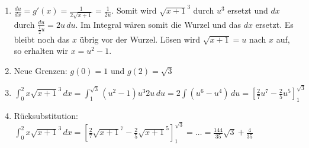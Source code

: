 \begin{enumerate}
	\item $\frac{du}{dx} = g'(x) = \frac{1}{2\sqrt{x+1}} = \frac{1}{2u}$. Somit
	wird $\sqrt{x+1}^3$ durch $u^3$ ersetzt und $dx$ durch
	$\frac{du}{\frac{1}{2}u} = 2u\,du$. Im Integral wären somit die Wurzel und das
	$dx$ ersetzt. Es bleibt noch das $x$ übrig vor der Wurzel. Lösen wird
	$\sqrt{x+1} = u$ nach $x$ auf, so erhalten wir $x = u^2 - 1$.
	\item Neue Grenzen: $g(0) = 1$ und $g(2) = \sqrt{3}$
	\item $\int_0^2 x \sqrt{x+1}^3 \,dx = \int_1^{\sqrt{3}} (u^2 - 1)u^3 2u \,du =
	2\int(u^6 -u^4) \,du = [\frac{2}{7}u^7 - \frac{2}{5}u^5]_{1}^{\sqrt{3}}$
	\item Rücksubstitution: $\int_0^2 x \sqrt{x+1}^3 \,dx =
	[\frac{2}{7}\sqrt{x+1}^7 - \frac{2}{5}\sqrt{x+1}^5]_{1}^{\sqrt{3}} = \ldots = \frac{144}{35}\sqrt{3} +
	\frac{4}{35}$
\end{enumerate}